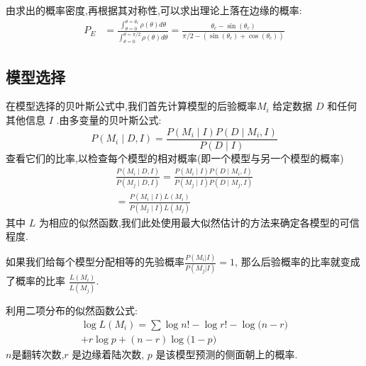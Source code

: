 \documentclass[UTF8]{gapd}
\begin{document}
由求出的概率密度,再根据其对称性,可以求出理论上落在边缘的概率:
\begin{equation}
\begin{aligned}
P_{E} &=\frac{\int_{\theta=0}^{\theta=\theta_{c}} \rho(\theta) d \theta}{\int_{\theta=0}^{\theta=\pi / 2} \rho(\theta) d \theta}
=\frac{\theta_{c}-\sin \left(\theta_{c}\right)}{\pi / 2-\left(\sin \left(\theta_{c}\right)+\cos \left(\theta_{c}\right)\right)}
\end{aligned}
\end{equation}
\subsection{模型选择}
在模型选择的贝叶斯公式中,我们首先计算模型的后验概率$M_{i}$      给定数据 $D$   和任何其他信息  $I$  .由多变量的贝叶斯公式:
\begin{equation}
P\left(M_{i} \mid D, I\right)=\frac{P\left(M_{i} \mid I\right) P\left(D \mid M_{i}, I\right)}{P(D \mid I)}
\end{equation}
查看它们的比率,以检查每个模型的相对概率(即一个模型与另一个模型的概率)
\begin{equation}
\begin{gathered}
\frac{P\left(M_{i} \mid D, I\right)}{P\left(M_{j} \mid D, I\right)}=\frac{P\left(M_{i} \mid I\right) P\left(D \mid M_{i}, I\right)}{P\left(M_{j} \mid I\right) P\left(D \mid M_{j}, I\right)} \\
=\frac{P\left(M_{i} \mid I\right) L\left(M_{i}\right)}{P\left(M_{j} \mid I\right) L\left(M_{j}\right)}
\end{gathered}
\end{equation}
其中   $L$  为相应的似然函数,我们此处使用最大似然估计的方法来确定各模型的可信程度.

如果我们给每个模型分配相等的先验概率$\frac{P(M_i|I)}{P(M_j|I)}=1$,
那么后验概率的比率就变成了概率的比率  $\frac{L(M_i)}{L(M_j)}$.

利用二项分布的似然函数公式:
\begin{equation}
\begin{gathered}
\log L\left( M_i \right) =\sum{\log}n!-\log r!-\log\mathrm{(}n-r)
\\
+r\log p+(n-r)\log\mathrm{(}1-p)
\end{gathered}
\end{equation}
$n$是翻转次数,$r$    是边缘着陆次数,  $p$  是该模型预测的侧面朝上的概率.
\end{document}
